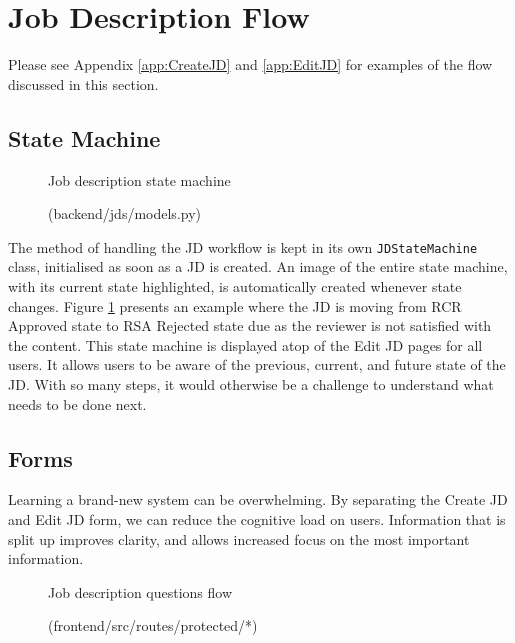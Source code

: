 \section{Job Description Flow}
Please see Appendix \ref{app:CreateJD} and \ref{app:EditJD} for examples of the flow discussed in this section. 
\subsection{State Machine}
\begin{figure}[h]
\centering
{}
\vspace{-20pt}
\caption{Job description state machine}
\vspace{-10pt}
\caption*{(backend/jds/models.py)}
\label{fig:jd-state}
\vspace{-5pt}
\end{figure}

The method of handling the JD workflow is kept in its own \texttt{JDStateMachine} class, initialised as soon as a JD is created. An image of the entire state machine, with its current state highlighted, is automatically created whenever state changes. Figure \ref{fig:jd-state} presents an example where the JD is moving from RCR Approved state to RSA Rejected state due as the reviewer is not satisfied with the content. This state machine is displayed atop of the Edit JD pages for all users. It allows users to be aware of the previous, current, and future state of the JD. With so many steps, it would otherwise be a challenge to understand what needs to be done next.

\subsection{Forms}
Learning a brand-new system can be overwhelming. By separating the Create JD and Edit JD form, we can reduce the cognitive load on users. Information that is split up improves clarity, and allows increased focus on the most important information. 

\begin{figure}[h]
\centering
{}
\vspace{-5pt}
\caption{Job description questions flow}
\vspace{-10pt}
\caption*{(frontend/src/routes/protected/*)}
\label{fig:jd-q-flow}
\vspace{-5pt}
\end{figure}

